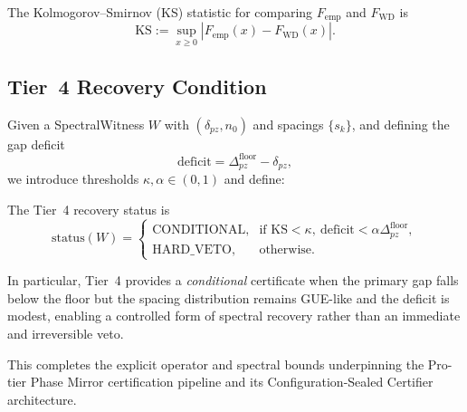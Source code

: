 \documentclass[11pt]{article}
\begin{document}
The Kolmogorov–Smirnov (KS) statistic for comparing $F_{\mathrm{emp}}$
and $F_{\mathrm{WD}}$ is
\[
  \mathrm{KS}
  := \sup_{x\ge 0} |F_{\mathrm{emp}}(x) - F_{\mathrm{WD}}(x)|.
\]

\subsection{Tier~4 Recovery Condition}

Given a SpectralWitness $W$ with $(\delta_{pz}, n_0)$ and spacings
$\{s_k\}$, and defining the gap deficit
\[
  \mathrm{deficit} = \Delta_{pz}^{\mathrm{floor}} - \delta_{pz},
\]
we introduce thresholds $\kappa,\alpha \in (0,1)$ and define:

\begin{definition}
The Tier~4 recovery status is
\[
  \mathrm{status}(W)
  =
  \begin{cases}
    \text{CONDITIONAL}, & \text{if }
      \mathrm{KS} < \kappa,\ \mathrm{deficit} < \alpha \Delta_{pz}^{\mathrm{floor}},\\[0.5ex]
    \text{HARD\_VETO}, & \text{otherwise}.
  \end{cases}
\]
\end{definition}

In particular, Tier~4 provides a \emph{conditional} certificate when the
primary gap falls below the floor but the spacing distribution remains
GUE-like and the deficit is modest, enabling a controlled form of
spectral recovery rather than an immediate and irreversible veto.

\bigskip

This completes the explicit operator and spectral bounds underpinning
the Pro-tier Phase Mirror certification pipeline and its
Configuration-Sealed Certifier architecture.

\nocite{*}


\end{document}
